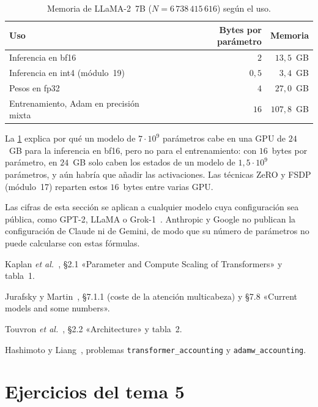 \begin{table}[ht]
\centering\small
\caption{Memoria de LLaMA-2~7B ($N=6\,738\,415\,616$) según el uso.}\label{tab:memoria}
\begin{tabular}{@{}lrr@{}}
\toprule
Uso & Bytes por parámetro & Memoria \\
\midrule
Inferencia en bf16 & $2$ & $13{,}5$~GB \\
Inferencia en int4 (módulo~19) & $0{,}5$ & $3{,}4$~GB \\
Pesos en fp32 & $4$ & $27{,}0$~GB \\
Entrenamiento, Adam en precisión mixta & $16$ & $107{,}8$~GB \\
\bottomrule
\end{tabular}
\end{table}

La \cref{tab:memoria} explica por qué un modelo de $7\cdot 10^{9}$ parámetros cabe en una GPU de $24$~GB para la inferencia en bf16, pero no para el entrenamiento: con $16$~bytes por parámetro, en $24$~GB solo caben los estados de un modelo de $1{,}5\cdot 10^{9}$ parámetros, y aún habría que añadir las activaciones. Las técnicas ZeRO y FSDP (módulo~17) reparten estos $16$~bytes entre varias GPU.

\begin{observacion}
Las cifras de esta sección se aplican a cualquier modelo cuya configuración sea pública, como GPT-2, LLaMA o Grok-1~\cite{grok1}. Anthropic y Google no publican la configuración de Claude ni de Gemini, de modo que su número de parámetros no puede calcularse con estas fórmulas.
\end{observacion}

\begin{lecturas}
\item Kaplan \emph{et al.}~\cite{kaplan}, §2.1 «Parameter and Compute Scaling of Transformers» y tabla~1.
\item Jurafsky y Martin~\cite{jm3}, §7.1.1 (coste de la atención multicabeza) y §7.8 «Current models and some numbers».
\item Touvron \emph{et al.}~\cite{llama}, §2.2 «Architecture» y tabla~2.
\item Hashimoto y Liang~\cite{cs336}, problemas \texttt{transformer\_accounting} y \texttt{adamw\_accounting}.
\end{lecturas}

\section*{Ejercicios del tema 5}

